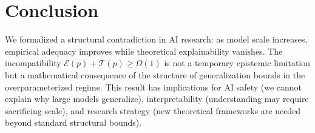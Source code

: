 \documentclass[12pt]{article}
\theoremstyle{definition}
\theoremstyle{remark}
\begin{document}
\section{Conclusion}

We formalized a structural contradiction in AI research: as model scale increases, empirical adequacy improves while theoretical explainability vanishes. The incompatibility $\mathcal{E}(p) + \mathcal{T}(p) \geq \Omega(1)$ is not a temporary epistemic limitation but a mathematical consequence of the structure of generalization bounds in the overparameterized regime. This result has implications for AI safety (we cannot explain why large models generalize), interpretability (understanding may require sacrificing scale), and research strategy (new theoretical frameworks are needed beyond standard structural bounds).
\end{document}
